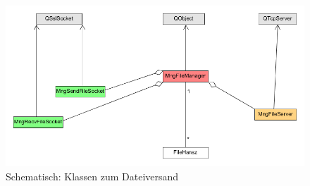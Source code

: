 \begin{figure}
\includegraphics[scale=.35]{classDiagFile}
\caption{Schematisch: Klassen zum Dateiversand}
\label{file_d}
\end{figure}

